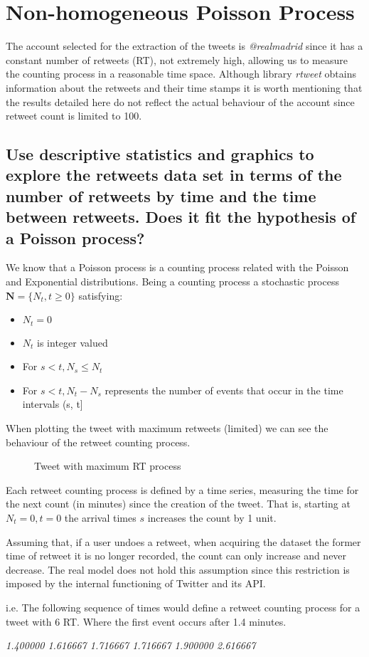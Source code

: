 
\section{Non-homogeneous Poisson Process}

The account selected for the extraction of the tweets is \textit{@realmadrid} since it has a constant number of retweets (RT), not extremely high, allowing us to measure the counting process in a reasonable time space. Although library \textit{rtweet} obtains information about the retweets and their time stamps it is worth mentioning that the results detailed here do not reflect the actual behaviour of the account since retweet count is limited to 100.

\subsection{Use descriptive statistics and graphics to explore the retweets data set in terms of the number of retweets by time and the time between retweets. Does it fit the hypothesis of a Poisson process?}

We know that a Poisson process is a counting process related with the Poisson and Exponential distributions. Being a counting process a stochastic process $\mathbf{N} = \{ N_t, t \geq 0 \}$ satisfying:
\begin{itemize}
	\item $N_t=0$
	\item $N_t$ is integer valued
	\item For $s<t, N_s \leq N_t$
	\item For $s<t, N_t - N_s$ represents the number of events that occur in the time intervals (s, t]
\end{itemize}

When plotting the tweet with maximum retweets (limited) we can see the behaviour of the retweet counting process.
\begin{figure}[H]
	\centering
	
	\vspace*{-0.9em}
	\caption{Tweet with maximum RT process}
\end{figure}

Each retweet counting process is defined by a time series, measuring the time for the next count (in minutes) since the creation of the tweet. That is, starting at $N_t=0, t=0$ the arrival times $s$ increases the count by 1 unit.

Assuming that, if a user undoes a retweet, when acquiring the dataset the former time of retweet it is no longer recorded, the count can only increase and never decrease. The real model does not hold this assumption since this restriction is imposed by the internal functioning of Twitter and its API.

i.e. The following sequence of times would define a retweet counting process for a tweet with 6 RT. Where the first event occurs after 1.4 minutes.

\begin{center}
\textit{1.400000    1.616667    1.716667    1.716667    1.900000    2.616667}
\end{center}
